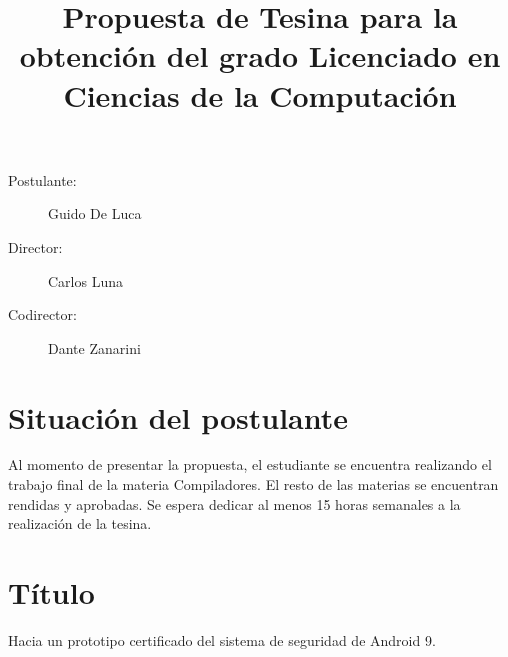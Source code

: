 \documentclass[a4paper]{article}
\begin{document}
\title{Propuesta de Tesina para la obtención del grado Licenciado en Ciencias de la Computación}
\maketitle

\begin{description}
    \item[Postulante: ] Guido De Luca
    \item[Director: ] Carlos Luna
    \item[Codirector: ] Dante Zanarini
\end{description}

\section{Situación del postulante}
Al momento de presentar la propuesta, el estudiante se encuentra realizando el
trabajo final de la materia Compiladores. El resto de las materias se encuentran
rendidas y aprobadas. Se espera dedicar al menos 15 horas semanales a la realización
de la tesina.

\section{Título}
Hacia un prototipo certificado del sistema de seguridad de Android 9.









\printbibliography
\end{document}
